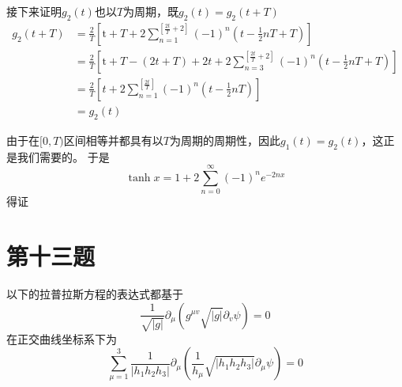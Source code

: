 \documentclass[a4paper]{ctexart}
\begin{document}
接下来证明$g_2(t)$也以$T$为周期，既$g_2(t)=g_2(t+T)$
$$
    \begin{aligned}
        g_2\left( t+T \right)
         & =\frac{2}{T}\left[ \text{t}+T+2\sum_{n=1}^{\left[ \frac{2t}{T}+2 \right]}{\left( -1 \right)}^n\left( t-\frac{1}{2}nT+T \right) \right]                         \\
         & =\frac{2}{T}\left[ \text{t}+T-\left( 2t+T \right) +2t+2\sum_{n=3}^{\left[ \frac{2t}{T}+2 \right]}{\left( -1 \right)}^n\left( t-\frac{1}{2}nT+T \right) \right] \\
         & =\frac{2}{T}\left[ t+2\sum_{n=1}^{\left[ \frac{2t}{T} \right]}{\left( -1 \right)}^n\left( t-\frac{1}{2}nT \right) \right]                                      \\
         & =g_2\left( t \right)
    \end{aligned}
$$

由于在$[0,T)$区间相等并都具有以$T$为周期的周期性，因此$g_1(t)=g_2(t)$，这正是我们需要的。
于是
$$
    \tanh x=1+2 \sum_{n=0}^{\infty}(-1)^{n} e^{-2 n x}
$$
得证


\section{第十三题}
以下的拉普拉斯方程的表达式都基于
$$
    \frac{1}{\sqrt{|g|}} \partial_{\mu}\left(g^{\mu v} \sqrt{|g|} \partial_{v} \psi\right)=0
$$
在正交曲线坐标系下为
$$
    \sum_{\mu =1}^3{\frac{1}{|h_1h_2h_3|}\partial _{\mu}\left( \frac{1}{h_{\mu}}\sqrt{|h_1h_2h_3|}\partial _{\mu}\psi \right)}=0
$$
\end{document}
